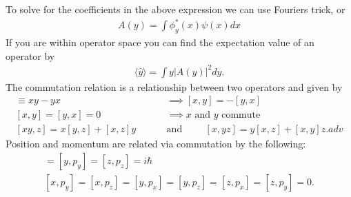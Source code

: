 To solve for the coefficients in the above expression we can use Fouriers trick, or
\begin{align}
	A(y) = \int \phi_y^*(x)\psi(x)dx 	
\end{align}
If you are within operator space you can find the expectation value of an operator by
\begin{align}
	\langle \hat{y} \rangle = \int y |A(y)|^2 dy.
\end{align}
The commutation relation is a relationship between two operators and given by
\begin{align}
	[x,y] \equiv xy-yx &\implies [x,y] = -[y,x] \\
	[x,y]=[y,x]=0 &\implies \textrm{$x$ and $y$ commute} \\
	[xy,z] = x[y,z]+[x,z]y \hspace{1cm} &\textrm{and} \hspace{1cm}[x,yz] = y[x,z]+[x,y]z.adv
\end{align} 
Position and momentum are related via commutation by the following:
\begin{align}
	[x,p_x]=[y,p_y]=[z,p_z]=i\hbar \\
	[x,p_y]=[x,p_z]=[y,p_x]=[y,p_z]=[z,p_x]=[z,p_y]=0.
\end{align} 

